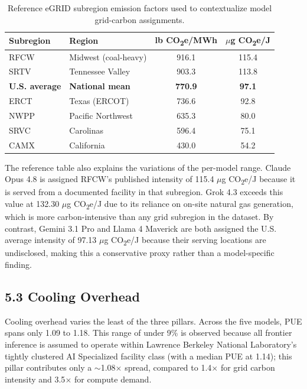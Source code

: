 \documentclass[11pt]{article}
\newcommand{\cotwo}{CO\textsubscript{2}}     %
\begin{document}
\begin{table}[htbp]
  \centering
  \begin{tabular}{|l|l|c|c|}
    \hline
    \textbf{Subregion} & \textbf{Region} & \textbf{lb \cotwo e/MWh} & \textbf{$\mu$g \cotwo e/J} \\
    \hline
    RFCW & Midwest (coal-heavy) & 916.1 & 115.4 \\
    \hline
    SRTV & Tennessee Valley & 903.3 & 113.8 \\
    \hline
    \rowcolor{usavg}
    \textbf{U.S. average} & \textbf{National mean} & \textbf{770.9} & \textbf{97.1} \\
    \hline
    ERCT & Texas (ERCOT) & 736.6 & 92.8 \\
    \hline
    NWPP & Pacific Northwest & 635.3 & 80.0 \\
    \hline
    SRVC & Carolinas & 596.4 & 75.1 \\
    \hline
    CAMX & California & 430.0 & 54.2 \\
    \hline
  \end{tabular}
  \caption{Reference eGRID subregion emission factors used to contextualize model grid-carbon assignments.}
  \label{tab:grid-reference-vertical}
\end{table}

The reference table also explains the variations of the per-model range. Claude Opus 4.8 is assigned RFCW's published intensity of 115.4 $\mu$g \cotwo e/J because it is served from a documented facility in that subregion. Grok 4.3 exceeds this value at 132.30 $\mu$g \cotwo e/J due to its reliance on on-site natural gas generation, which is more carbon-intensive than any grid subregion in the dataset. By contrast, Gemini 3.1 Pro and Llama 4 Maverick are both assigned the U.S. average intensity of 97.13 $\mu$g \cotwo e/J because their serving locations are undisclosed, making this a conservative proxy rather than a model-specific finding.

\subsection*{5.3 Cooling Overhead}

Cooling overhead varies the least of the three pillars. Across the five models, PUE spans only 1.09 to 1.18. This range of under 9\% is observed because all frontier inference is assumed to operate within Lawrence Berkeley National Laboratory's tightly clustered AI Specialized facility class (with a median PUE at 1.14); this pillar contributes only a $\sim$1.08$\times$ spread, compared to 1.4$\times$ for grid carbon intensity and 3.5$\times$ for compute demand.
\end{document}
